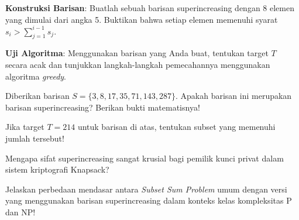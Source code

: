 \begin{aktivitas}
  \item \textbf{Konstruksi Barisan}: Buatlah sebuah barisan superincreasing dengan 8 elemen yang dimulai dari angka 5. Buktikan bahwa setiap elemen memenuhi syarat $s_i > \sum_{j=1}^{i-1} s_j$.
  \item \textbf{Uji Algoritma}: Menggunakan barisan yang Anda buat, tentukan target $T$ secara acak dan tunjukkan langkah-langkah pemecahannya menggunakan algoritma \textit{greedy}.
\end{aktivitas}

\begin{latihan}
  \item Diberikan barisan $S = \{3, 8, 17, 35, 71, 143, 287\}$. Apakah barisan ini merupakan barisan superincreasing? Berikan bukti matematisnya!
  \item Jika target $T = 214$ untuk barisan di atas, tentukan subset yang memenuhi jumlah tersebut!
  \item Mengapa sifat superincreasing sangat krusial bagi pemilik kunci privat dalam sistem kriptografi Knapsack?
  \item Jelaskan perbedaan mendasar antara \textit{Subset Sum Problem} umum dengan versi yang menggunakan barisan superincreasing dalam konteks kelas kompleksitas P dan NP!
\end{latihan}
